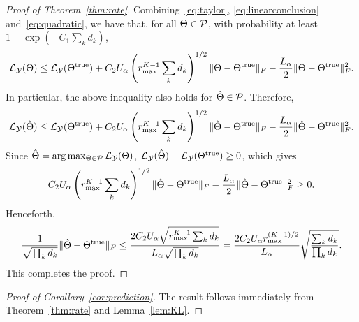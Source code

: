\documentclass[11pt]{article}
\theoremstyle{plain}
\theoremstyle{definition}
\begin{document}
\begin{proof}[Proof of Theorem~\ref{thm:rate}]
Combining~\eqref{eq:taylor}, \eqref{eq:linearconclusion} and~\eqref{eq:quadratic}, we have that, for all $\Theta\in\mathcal{P}$, with probability at least $1-\exp(-C_1 \sum_kd_k)$,
\[
\mathcal{L}_{\mathcal{Y}}(\Theta)\leq \mathcal{L}_{\mathcal{Y}}(\Theta^{\text{true}})+C_2U_\alpha  \left(r_{\max}^{K-1}\sum_k d_k\right)^{1/2}  \lVert\Theta-\Theta^{\text{true}}\rVert_F-{L_\alpha\over 2}\lVert\Theta-\Theta^{\text{true}}\rVert_F^2.
\]
In particular, the above inequality also holds for $\hat \Theta\in\mathcal{P}$. Therefore,
\[
\mathcal{L}_{\mathcal{Y}}(\hat \Theta)\leq \mathcal{L}_{\mathcal{Y}}(\Theta^{\text{true}})+C_2U_\alpha \left(r_{\max}^{K-1}\sum_k d_k\right)^{1/2}  \lVert\hat \Theta-\Theta^{\text{true}}\rVert_F-{L_\alpha\over 2} \lVert\hat \Theta-\Theta^{\text{true}}\rVert_F^2.
\]
Since $\hat \Theta=\arg\max_{\Theta\in\mathcal{P}}\mathcal{L}_{\mathcal{Y}}(\Theta)$, $\mathcal{L}_{\mathcal{Y}}(\hat \Theta)-\mathcal{L}_{\mathcal{Y}}(\Theta^{\text{true}})\geq 0$, which gives
\[
C_2U_\alpha \left(r_{\max}^{K-1}\sum_k d_k\right)^{1/2}  \lVert\hat \Theta-\Theta^{\text{true}}\rVert_F-{L_\alpha\over 2}\lVert\hat \Theta-\Theta^{\text{true}}\rVert_F^2\geq 0.
\]
Henceforth,
\[
{1\over \sqrt{\prod_k d_k}} \lVert\hat \Theta-\Theta^{\text{true}}\rVert_F\leq {2C_2U_\alpha \sqrt{r_{\max}^{K-1}\sum_k d_k}\over L_\alpha \sqrt{\prod_k d_k}}={2C_2U_\alpha r_{\max}^{(K-1)/2}\over L_\alpha} \sqrt{ \sum_k d_k \over \prod_k d_k}.
\]
This completes the proof.
\end{proof}

\begin{proof}[Proof of Corollary~\ref{cor:prediction}]
The result follows immediately from Theorem~\ref{thm:rate} and Lemma~\ref{lem:KL}.
\end{proof}
\end{document}
